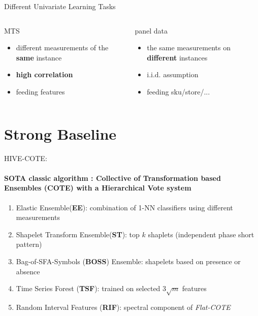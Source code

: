 \documentclass[aspectratio=169]{ctexbeamer}
\begin{document}
\begin{frame}{Different Univariate Learning Tasks}
	\begin{columns}

		\begin{block}{MTS}
			\begin{itemize}
				\item different measurements of the \textbf{same} instance
				\item \textbf{high correlation}
				\item feeding features
			\end{itemize}
		\end{block}

		\begin{block}{panel data}
			\begin{itemize}
				\item the same measurements on \textbf{different} instances
				\item i.i.d. assumption
				\item feeding sku/store/...
			\end{itemize}
		\end{block}
	\end{columns}
\end{frame}



\section{Strong Baseline}
\begin{frame}{HIVE-COTE:}
	\framesubtitle{\textbf{SOTA} classic algorithm : Collective of Transformation based \textbf{Ensembles} (COTE) with a Hierarchical Vote system}
	\begin{enumerate}
		\item Elastic Ensemble(\textbf{EE}): combination of 1-NN classifiers using different measurements
		\item Shapelet Transform Ensemble(\textbf{ST}): top $k$ shaplets (independent phase short pattern)
		\item Bag-of-SFA-Symbols (\textbf{BOSS}) Ensemble: shapelets based on presence or absence
		\item Time Series Forest (\textbf{TSF}): trained on selected $3 \sqrt{m}$ features
		\item Random Interval Features (\textbf{RIF}): spectral component of \textit{Flat-COTE}
	\end{enumerate}
\end{frame}
\end{document}
